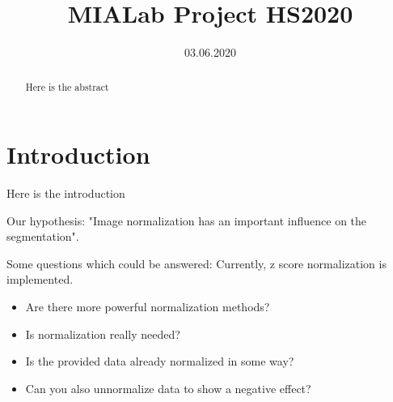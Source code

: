 \documentclass[conference]{IEEEtran}
\begin{document}

\title{MIALab Project HS2020}

\author{
\and
{}
\and
{}
}
\date{03.06.2020}

\maketitle




\newpage

\begin{abstract}
Here is the abstract


\end{abstract}

\newpage


\section{Introduction}
Here is the introduction

Our hypothesis: "Image normalization has an important influence on the segmentation".

Some questions which could be answered:
Currently, z score normalization is implemented.
\begin{itemize}
\item Are there more powerful normalization methods?
\item Is normalization really needed?
\item Is the provided data already normalized in some way?
\item Can you also unnormalize data to show a negative effect?
\end{itemize}
\end{document}
